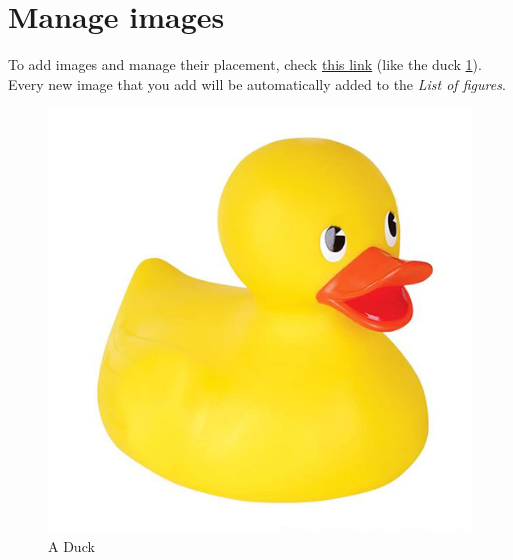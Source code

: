 \section{Manage images}\label{manage_images}
To add images and manage their placement, check \href{https://www.overleaf.com/learn/latex/Positioning_images_and_tables}{this link} (like the duck \ref{fig:duck}). Every new image that you add will be automatically added to the \textit{List of figures}. 

\begin{figure}[!ht]
    \centering
    \includegraphics[scale=0.1]{document/chapters/manage_chapters/images/duck.jpeg}
    \caption{A Duck}
    \label{fig:duck}
\end{figure}